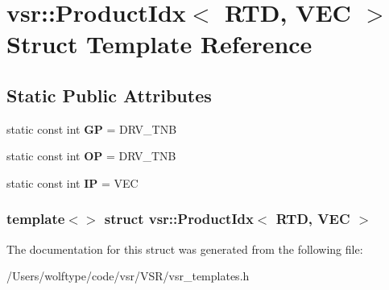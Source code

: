 \hypertarget{structvsr_1_1_product_idx_3_01_r_t_d_00_01_v_e_c_01_4}{\section{vsr\-:\-:Product\-Idx$<$ R\-T\-D, V\-E\-C $>$ Struct Template Reference}
\label{structvsr_1_1_product_idx_3_01_r_t_d_00_01_v_e_c_01_4}
}
\subsection*{Static Public Attributes}
\begin{DoxyCompactItemize}
\item 
\hypertarget{structvsr_1_1_product_idx_3_01_r_t_d_00_01_v_e_c_01_4_a5eb9fcc86b58d2a168584df668ade47b}{static const int {\bfseries G\-P} = D\-R\-V\-\_\-\-T\-N\-B}\label{structvsr_1_1_product_idx_3_01_r_t_d_00_01_v_e_c_01_4_a5eb9fcc86b58d2a168584df668ade47b}

\item 
\hypertarget{structvsr_1_1_product_idx_3_01_r_t_d_00_01_v_e_c_01_4_a4646398248aa71e3587466248d733ee8}{static const int {\bfseries O\-P} = D\-R\-V\-\_\-\-T\-N\-B}\label{structvsr_1_1_product_idx_3_01_r_t_d_00_01_v_e_c_01_4_a4646398248aa71e3587466248d733ee8}

\item 
\hypertarget{structvsr_1_1_product_idx_3_01_r_t_d_00_01_v_e_c_01_4_aef3359607497b5167e4a0e2f90c55891}{static const int {\bfseries I\-P} = V\-E\-C}\label{structvsr_1_1_product_idx_3_01_r_t_d_00_01_v_e_c_01_4_aef3359607497b5167e4a0e2f90c55891}

\end{DoxyCompactItemize}
\subsubsection*{template$<$$>$ struct vsr\-::\-Product\-Idx$<$ R\-T\-D, V\-E\-C $>$}



The documentation for this struct was generated from the following file\-:\begin{DoxyCompactItemize}
\item 
/\-Users/wolftype/code/vsr/\-V\-S\-R/vsr\-\_\-templates.\-h\end{DoxyCompactItemize}
